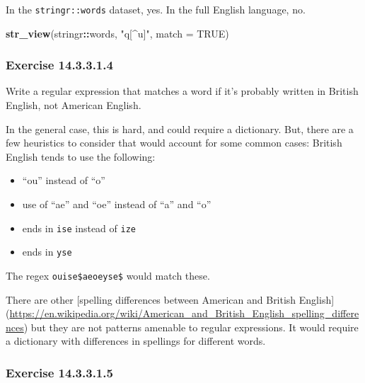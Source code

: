 \documentclass[]{book}
\newenvironment{Shaded}{\begin{snugshade}}{\end{snugshade}}
\newcommand{\DataTypeTok}[1]{\textcolor[rgb]{0.13,0.29,0.53}{#1}}
\newcommand{\KeywordTok}[1]{\textcolor[rgb]{0.13,0.29,0.53}{\textbf{#1}}}
\newcommand{\NormalTok}[1]{#1}
\newcommand{\OperatorTok}[1]{\textcolor[rgb]{0.81,0.36,0.00}{\textbf{#1}}}
\newcommand{\OtherTok}[1]{\textcolor[rgb]{0.56,0.35,0.01}{#1}}
\newcommand{\StringTok}[1]{\textcolor[rgb]{0.31,0.60,0.02}{#1}}
\providecommand{\tightlist}{%
  \setlength{\itemsep}{0pt}\setlength{\parskip}{0pt}}
\theoremstyle{plain}
\theoremstyle{remark}
\begin{document}
In the \texttt{stringr::words} dataset, yes. In the full English
language, no.

\begin{Shaded}
\begin{Highlighting}[]
\KeywordTok{str_view}\NormalTok{(stringr}\OperatorTok{::}\NormalTok{words, }\StringTok{"q[^u]"}\NormalTok{, }\DataTypeTok{match =} \OtherTok{TRUE}\NormalTok{)}
\end{Highlighting}
\end{Shaded}

\hypertarget{exercise-14.3.3.1.4}{%
\subsubsection*{\texorpdfstring{Exercise
{14.3.3.1.4}}{Exercise 14.3.3.1.4}}\label{exercise-14.3.3.1.4}}

Write a regular expression that matches a word if it's probably written
in British English, not American English.

In the general case, this is hard, and could require a dictionary. But,
there are a few heuristics to consider that would account for some
common cases: British English tends to use the following:

\begin{itemize}
\tightlist
\item
  ``ou'' instead of ``o''
\item
  use of ``ae'' and ``oe'' instead of ``a'' and ``o''
\item
  ends in \texttt{ise} instead of \texttt{ize}
\item
  ends in \texttt{yse}
\end{itemize}

The regex
\texttt{ou\textbar{}ise\$\textbar{}ae\textbar{}oe\textbar{}yse\$} would
match these.

There are other {[}spelling differences between American and British
English{]}
(\url{https://en.wikipedia.org/wiki/American_and_British_English_spelling_differences})
but they are not patterns amenable to regular expressions. It would
require a dictionary with differences in spellings for different words.

\hypertarget{exercise-14.3.3.1.5}{%
\subsubsection*{\texorpdfstring{Exercise
{14.3.3.1.5}}{Exercise 14.3.3.1.5}}\label{exercise-14.3.3.1.5}}
\end{document}
